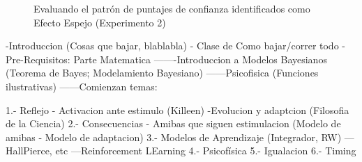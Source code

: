 \begin{figure}[th]
\caption[MERating_Exp2]{Evaluando el patrón de puntajes de confianza identificados como Efecto Espejo (Experimento 2)}
\label{fig:MERating_E2}
\end{figure}












 
-Introduccion (Cosas que bajar, blablabla) - Clase de Como bajar/correr todo
-Pre-Requisitos: Parte Matematica
-------Introduccion a Modelos Bayesianos (Teorema de Bayes; Modelamiento Bayesiano)
------Psicofisica (Funciones ilustrativas)
------Comienzan temas:

1.- Reflejo - Activacion ante estimulo (Killeen)
-Evolucion  y adaptcion (Filosofia de la Ciencia)
2.- Consecuencias - Amibas que siguen estimulacion (Modelo de amibas - Modelo de adaptacion)
3.- Modelos de Aprendizaje (Integrador, RW)
---HallPierce, etc
---Reinforcement LEarning
4.- Psicofísica
5.- Igualacion
6.- Timing

